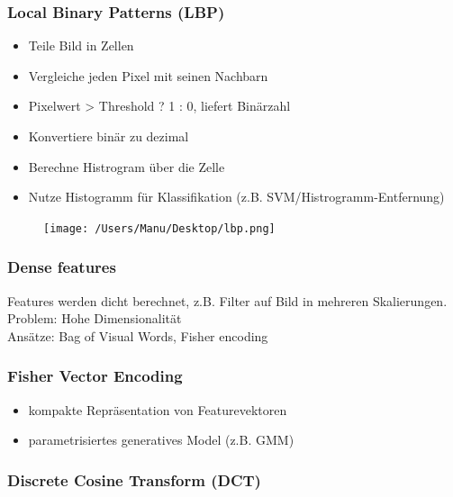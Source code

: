 \documentclass[paper=a4, fontsize=11pt]{scrartcl} %
\numberwithin{equation}{section} %
\numberwithin{figure}{section} %
\numberwithin{table}{section} %
\begin{document}
\subsubsection{Local Binary Patterns (LBP)}

\begin{minipage}{0.65\textwidth}
\begin{itemize}
\item Teile Bild in Zellen
\item Vergleiche jeden Pixel mit seinen Nachbarn
\item Pixelwert > Threshold ? 1 : 0, liefert Binärzahl
\item Konvertiere binär zu dezimal
\item Berechne Histrogram über die Zelle
\item Nutze Histogramm für Klassifikation (z.B. SVM/Histrogramm-Entfernung)
\end{itemize}
\end{minipage} \hfill
\begin{minipage}{0.3\textwidth}
\begin{figure}[H]
\texttt{[image: /Users/Manu/Desktop/lbp.png]}
\end{figure}
\end{minipage}

\subsubsection{Dense features}

Features werden dicht berechnet, z.B. Filter auf Bild in mehreren Skalierungen.\\ 
Problem: Hohe Dimensionalität\\ 
Ansätze: Bag of Visual Words, Fisher encoding

\subsubsection{Fisher Vector Encoding}

\begin{itemize}
\item kompakte Repräsentation von Featurevektoren
\item parametrisiertes generatives Model (z.B. GMM)
\end{itemize}

\subsubsection{Discrete Cosine Transform (DCT)}
\end{document}
